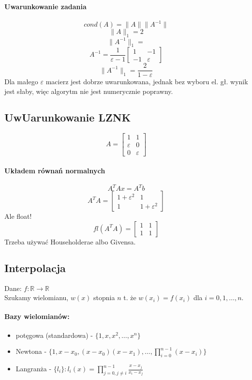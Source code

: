 \documentclass{article}
\begin{document}
\paragraph{Uwarunkowanie zadania}
$$ cond(A)=\|A\|\|A^{-1}\| $$
$$ \|A\|_1=2 $$
$$ \|A^{-1}\|_1= $$
$$ A^{-1}= \frac{1}{\varepsilon-1}\begin{bmatrix}
1&-1\\
-1&\varepsilon
\end{bmatrix}$$
$$ \|A^{-1}\|_1= \frac2{1-\varepsilon}$$
Dla małego $ \varepsilon $ macierz jest dobrze uwarunkowana, jednak bez wyboru el. gł. wynik jest słaby, więc algorytm nie jest numerycznie poprawny.
\subsection{UwUarunkowanie LZNK}
$$A=\begin{bmatrix}
1&1\\
\varepsilon&0\\
0&\varepsilon
\end{bmatrix}$$
\paragraph{Układem równań normalnych}
$$A^TAx=A^Tb$$
$$A^TA=\begin{bmatrix}
1+\varepsilon^2&1\\
1&1+\varepsilon^2
\end{bmatrix}$$
Ale float!
$$fl(A^TA)=\begin{bmatrix}
1&1\\
1&1
\end{bmatrix}$$
Trzeba używać Householderae albo Givensa.
\subsection{Interpolacja}
Dane: $ f:\mathbb{R} \rightarrow \mathbb{R} $\\
Szukamy wielomianu, $ w(x) $ stopnia $n$ t. że $ w(x_i)=f(x_i) $ dla $ i=0,1,\dots,n $.
\paragraph{Bazy wielomianów:}
\begin{itemize}
	\item potęgowa (standardowa) - $ \{1,x,x^2,\dots,x^n\} $
	\item Newtona - $ \{1, x-x_0, (x-x_0)(x-x_1), \dots,  \prod_{i=0}^{n-1}(x-x_i)\} $
	\item Langranża - $ \{l_i\} : l_i(x)=\prod_{j=0, j\not=i}^{n-1}\frac{x-x_j}{x_i-x_j} $
\end{itemize}
\end{document}
